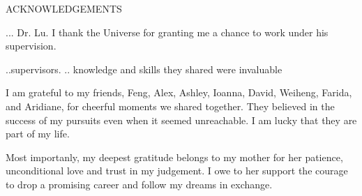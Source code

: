 \newpage
{}

\begin{center}
ACKNOWLEDGEMENTS
\end{center}

... Dr. Lu. I thank the Universe for granting me a chance to work under his supervision.

..supervisors. .. knowledge and skills they shared were invaluable

I am grateful to my friends, Feng, Alex, Ashley, Ioanna, David, Weiheng,  Farida, and Aridiane, 
 for cheerful moments we shared together. They believed in the success of my  pursuits even when it seemed unreachable. I am lucky that they are part of my life. 

Most importanly, my deepest gratitude belongs to my mother for her patience, unconditional love and trust in my judgement. %
I owe to her support the courage to drop a promising career and follow my dreams in exchange.
%
%
